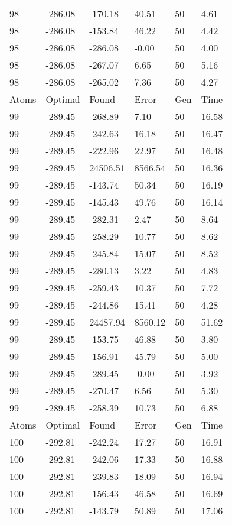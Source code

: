 \documentclass{report}
\begin{document}
\begin{appendix}
\begin{longtable}{llllll}
98 & -286.08 & -170.18 & 40.51 & 50 & 4.61 \\
98 & -286.08 & -153.84 & 46.22 & 50 & 4.42 \\
98 & -286.08 & -286.08 & -0.00 & 50 & 4.00 \\
98 & -286.08 & -267.07 & 6.65 & 50 & 5.16 \\
98 & -286.08 & -265.02 & 7.36 & 50 & 4.27 \\
Atoms & Optimal & Found & Error & Gen & Time \\
99 & -289.45 & -268.89 & 7.10 & 50 & 16.58 \\
99 & -289.45 & -242.63 & 16.18 & 50 & 16.47 \\
99 & -289.45 & -222.96 & 22.97 & 50 & 16.48 \\
99 & -289.45 & 24506.51 & 8566.54 & 50 & 16.36 \\
99 & -289.45 & -143.74 & 50.34 & 50 & 16.19 \\
99 & -289.45 & -145.43 & 49.76 & 50 & 16.14 \\
99 & -289.45 & -282.31 & 2.47 & 50 & 8.64 \\
99 & -289.45 & -258.29 & 10.77 & 50 & 8.62 \\
99 & -289.45 & -245.84 & 15.07 & 50 & 8.52 \\
99 & -289.45 & -280.13 & 3.22 & 50 & 4.83 \\
99 & -289.45 & -259.43 & 10.37 & 50 & 7.72 \\
99 & -289.45 & -244.86 & 15.41 & 50 & 4.28 \\
99 & -289.45 & 24487.94 & 8560.12 & 50 & 51.62 \\
99 & -289.45 & -153.75 & 46.88 & 50 & 3.80 \\
99 & -289.45 & -156.91 & 45.79 & 50 & 5.00 \\
99 & -289.45 & -289.45 & -0.00 & 50 & 3.92 \\
99 & -289.45 & -270.47 & 6.56 & 50 & 5.30 \\
99 & -289.45 & -258.39 & 10.73 & 50 & 6.88 \\
Atoms & Optimal & Found & Error & Gen & Time \\
100 & -292.81 & -242.24 & 17.27 & 50 & 16.91 \\
100 & -292.81 & -242.06 & 17.33 & 50 & 16.88 \\
100 & -292.81 & -239.83 & 18.09 & 50 & 16.94 \\
100 & -292.81 & -156.43 & 46.58 & 50 & 16.69 \\
100 & -292.81 & -143.79 & 50.89 & 50 & 17.06 \\

\end{longtable}
\end{appendix}
\end{document}

